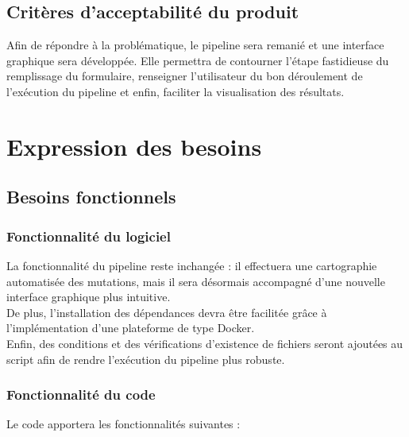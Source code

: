 \documentclass[12pt]{article}
\begin{document}
\subsection{Critères d'acceptabilité du produit}

Afin de répondre à la problématique, le pipeline sera remanié et une interface graphique sera développée. Elle permettra de contourner l'étape fastidieuse du remplissage du formulaire, renseigner l'utilisateur du bon déroulement de l'exécution du pipeline et enfin, faciliter la visualisation des résultats.

\section{Expression des besoins}
\subsection{Besoins fonctionnels}

\subsubsection{Fonctionnalité du logiciel}

La fonctionnalité du pipeline reste inchangée : il effectuera une cartographie automatisée des mutations, mais il sera désormais accompagné d'une nouvelle interface graphique plus intuitive. \\
De plus, l'installation des dépendances devra être facilitée grâce à l'implémentation d'une plateforme de type Docker.\\
Enfin, des conditions et des vérifications d'existence de fichiers seront ajoutées au script afin de rendre l'exécution du pipeline plus robuste.

\subsubsection{Fonctionnalité du code}

Le code apportera les fonctionnalités suivantes :
\end{document}
